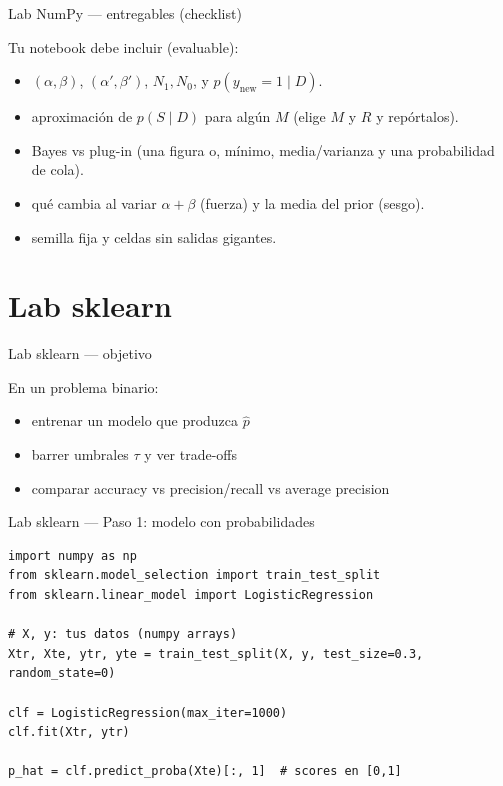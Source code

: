 \begin{frame}{Lab NumPy — entregables (checklist)}

Tu notebook debe incluir (evaluable):
\begin{itemize}
  \item {} \((\alpha,\beta)\), \((\alpha',\beta')\), \(N_1,N_0\), y \(p(y_{\text{new}}=1\mid D)\).
  \item {} aproximación de \(p(S\mid D)\) para algún \(M\) (elige \(M\) y \(R\) y repórtalos).
  \item {} Bayes vs plug-in (una figura o, mínimo, media/varianza y una probabilidad de cola).
  \item {} qué cambia al variar \(\alpha+\beta\) (fuerza) y la media del prior (sesgo).
  \item {} semilla fija y celdas sin salidas gigantes.
\end{itemize}
\end{frame}

\section[Lab sklearn]{Lab sklearn\label{sec:labsklearn}}

\begin{frame}{Lab sklearn — objetivo}

En un problema binario:
\begin{itemize}
  \item entrenar un modelo que produzca \(\hat p\)
  \item barrer umbrales \(\tau\) y ver trade-offs
  \item comparar accuracy vs precision/recall vs average precision
\end{itemize}
\end{frame}

\begin{frame}[fragile]{Lab sklearn — Paso 1: modelo con probabilidades}

\begin{verbatim}
import numpy as np
from sklearn.model_selection import train_test_split
from sklearn.linear_model import LogisticRegression

# X, y: tus datos (numpy arrays)
Xtr, Xte, ytr, yte = train_test_split(X, y, test_size=0.3, random_state=0)

clf = LogisticRegression(max_iter=1000)
clf.fit(Xtr, ytr)

p_hat = clf.predict_proba(Xte)[:, 1]  # scores en [0,1]
\end{verbatim}
\end{frame}

